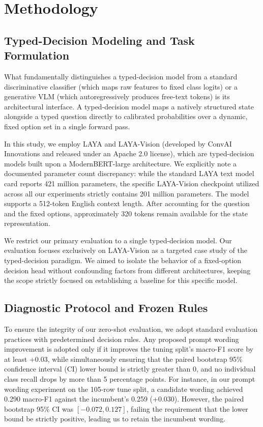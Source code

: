 \documentclass{article} %
\begin{document}
\section{Methodology}
\label{sec:method}
\subsection{Typed-Decision Modeling and Task Formulation}
What fundamentally distinguishes a typed-decision model from a standard discriminative classifier (which maps raw features to fixed class logits) or a generative VLM (which autoregressively produces free-text tokens) is its architectural interface. A typed-decision model maps a natively structured state alongside a typed question directly to calibrated probabilities over a dynamic, fixed option set in a single forward pass. 

In this study, we employ LAYA and LAYA-Vision (developed by ConvAI Innovations and released under an Apache 2.0 license), which are typed-decision models built upon a ModernBERT-large architecture. We explicitly note a documented parameter count discrepancy: while the standard LAYA text model card reports 421 million parameters, the specific LAYA-Vision checkpoint utilized across all our experiments strictly contains 201 million parameters. The model supports a 512-token English context length. After accounting for the question and the fixed options, approximately 320 tokens remain available for the state representation. 

We restrict our primary evaluation to a single typed-decision model. Our evaluation focuses exclusively on LAYA-Vision as a targeted case study of the typed-decision paradigm. We aimed to isolate the behavior of a fixed-option decision head without confounding factors from different architectures, keeping the scope strictly focused on establishing a baseline for this specific model.

\subsection{Diagnostic Protocol and Frozen Rules}
To ensure the integrity of our zero-shot evaluation, we adopt standard evaluation practices with predetermined decision rules. Any proposed prompt wording improvement is adopted only if it improves the tuning split's macro-F1 score by at least $+0.03$, while simultaneously ensuring that the paired bootstrap 95\% confidence interval (CI) lower bound is strictly greater than 0, and no individual class recall drops by more than 5 percentage points. For instance, in our prompt wording experiment on the 105-row tune split, a candidate wording achieved 0.290 macro-F1 against the incumbent's 0.259 (+0.030). However, the paired bootstrap 95\% CI was $[-0.072, 0.127]$, failing the requirement that the lower bound be strictly positive, leading us to retain the incumbent wording.
\end{document}
